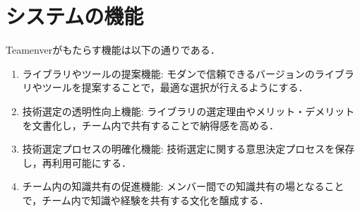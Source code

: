 \documentclass[main]{subfiles}
\begin{document}
\section{システムの機能}
Teamenverがもたらす機能は以下の通りである．
\begin{enumerate}
\item ライブラリやツールの提案機能: モダンで信頼できるバージョンのライブラリやツールを提案することで，最適な選択が行えるようにする．

\item 技術選定の透明性向上機能: ライブラリの選定理由やメリット・デメリットを文書化し，チーム内で共有することで納得感を高める．

\item 技術選定プロセスの明確化機能: 技術選定に関する意思決定プロセスを保存し，再利用可能にする．

\item チーム内の知識共有の促進機能: メンバー間での知識共有の場となることで，チーム内で知識や経験を共有する文化を醸成する．
\end{enumerate}
\end{document}
